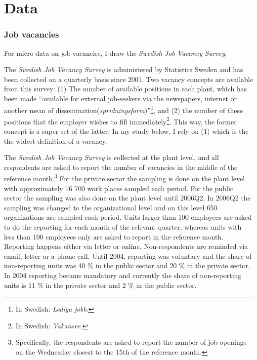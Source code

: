 \section{Data}
\label{sec:data}

\subsubsection{Job vacancies}

For micro-data on job-vacancies, I draw the \textit{Swedish Job Vacancy Survey}.

The \textit{Swedish Job Vacancy Survey} is administered by Statistics Sweden and has been collected on a quarterly basis since 2001. Two vacancy concepts are available from this survey: (1) The number of available positions in each plant, which has been made \enquote{available for external job-seekers via the newspapers, internet or another mean of dissemination(\emph{spridningsform})}\footnote{In Swedish: \emph{Lediga jobb}.}, and (2) the number of these positions that the employer wishes to fill immediately\footnote{In Swedish: \emph{Vakanser}.}. This way, the former concept is a super set of the latter. In my study below, I rely on (1) which is the the widest definition of a vacancy.

The \textit{Swedish Job Vacancy Survey} is collected at the plant level, and all respondents are asked to report the number of vacancies in the middle of the reference month.\footnote{Specifically, the respondents are asked to report the number of job openings on the Wednesday closest to the 15th of the reference month.} For the private sector the sampling is done on the plant level with approximately 16 700 work places sampled each period. For the public sector the sampling was also done on the plant level until 2006Q2. In 2006Q2 the sampling was changed to the organizational level and on this level 650 organizations are sampled each period. Units larger than 100 employees are asked to do the reporting for each month of the relevant quarter, whereas units with less than 100 employees only are asked to report in the reference month. Reporting happens either via letter or online. Non-respondents are reminded via email, letter or a phone call. Until 2004, reporting was voluntary and the share of non-reporting units was 40 \% in the public sector and 20 \% in the private sector. In 2004 reporting became mandatory and currently the share of non-reporting units is 11 \% in the private sector and 2 \% in the public sector.

